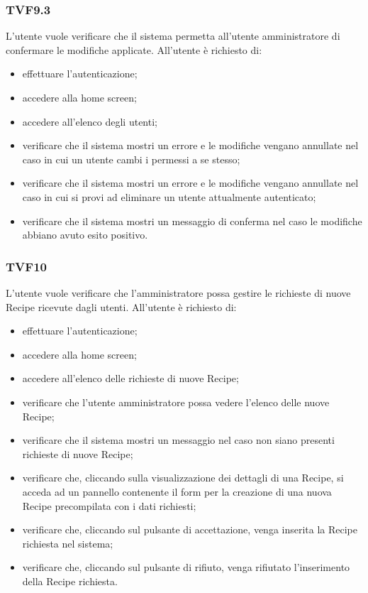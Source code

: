 		\subsubsection{TVF9.3}
			L'utente vuole verificare che il sistema permetta all'utente amministratore di confermare le modifiche applicate. All'utente è richiesto di:
			\begin{itemize}
				\item effettuare l'autenticazione;
				\item accedere alla home screen;
				\item accedere all'elenco degli utenti;
				\item verificare che il sistema mostri un errore e le modifiche vengano annullate nel caso in cui un utente cambi i permessi a se stesso;
				\item verificare che il sistema mostri un errore e le modifiche vengano annullate nel caso in cui si provi ad eliminare un utente attualmente autenticato;
				\item verificare che il sistema mostri un messaggio di conferma nel caso le modifiche abbiano avuto esito positivo.
			\end{itemize}
			
		\subsubsection{TVF10}
			L'utente vuole verificare che l'amministratore possa gestire le richieste di nuove Recipe ricevute dagli utenti. All'utente è richiesto di:
			\begin{itemize}
				\item effettuare l'autenticazione;
				\item accedere alla home screen;
				\item accedere all'elenco delle richieste di nuove Recipe;
				\item verificare che l'utente amministratore possa vedere l'elenco delle nuove Recipe;
				\item verificare che il sistema mostri un messaggio nel caso non siano presenti richieste di nuove Recipe;
				\item verificare che, cliccando sulla visualizzazione dei dettagli di una Recipe, si acceda ad un pannello contenente il form per la creazione di una nuova Recipe precompilata con i dati richiesti;
				\item verificare che, cliccando sul pulsante di accettazione, venga inserita la Recipe richiesta nel sistema;
				\item verificare che, cliccando sul pulsante di rifiuto, venga rifiutato l'inserimento della Recipe richiesta.
			\end{itemize}
			

